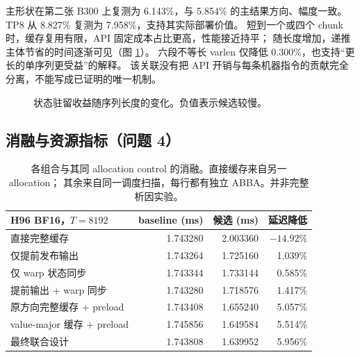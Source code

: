 \documentclass[11pt,a4paper,fontset=none]{ctexart}
\begin{document}
主形状在第二张 B300 上复测为 6.143\%，与 5.854\% 的主结果方向、幅度一致。
TP8 从 8.827\% 复测为 7.958\%，支持其实际部署价值。
短到一个或四个 chunk 时，缓存复用有限，API 固定成本占比更高，性能接近持平；
随长度增加，递推主体节省的时间逐渐可见（图 \ref{fig:length}）。
六段不等长 varlen 仅降低 0.300\%，也支持“更长的单序列更受益”的解释。
该关联没有把 API 开销与每条机器指令的贡献完全分离，不能写成已证明的唯一机制。

\begin{figure}[htbp]\centering
{}
\caption{状态驻留收益随序列长度的变化。负值表示候选较慢。}
\label{fig:length}
\end{figure}

\subsection{消融与资源指标（问题 4）}
\begin{table}[htbp]\centering\small
\begin{tabular}{lrrr}\toprule
H96 BF16，\(T=8192\)&baseline (ms)&候选 (ms)&延迟降低\\\midrule
直接完整缓存&1.743280&2.003360&$-14.92\%$\\
仅提前发布输出&1.743264&1.725160&1.039\%\\
仅 warp 状态同步&1.743344&1.733144&0.585\%\\
提前输出 + warp 同步&1.743280&1.718576&1.417\%\\
原方向完整缓存 + preload&1.743408&1.655240&5.057\%\\
value-major 缓存 + preload&1.745856&1.649584&5.514\%\\
最终联合设计&1.743808&1.639952&5.956\%\\\bottomrule
\end{tabular}
\caption{各组合与其同 allocation control 的消融。直接缓存来自另一 allocation；
其余来自同一调度扫描，每行都有独立 ABBA。并非完整析因实验。}
\label{tab:ablation}
\end{table}
\end{document}
